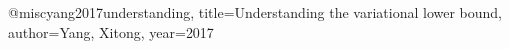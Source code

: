 @misc{yang2017understanding,
  title={Understanding the variational lower bound},
  author={Yang, Xitong},
  year={2017}
}